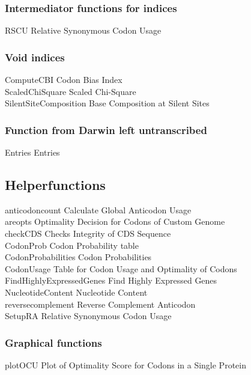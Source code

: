 \subsubsection{Intermediator functions for indices}
RSCU	Relative \quad Synonymous Codon Usage \\								%

\subsubsection{Void indices}
ComputeCBI	\quad Codon Bias Index  \\
ScaledChiSquare	\quad Scaled Chi-Square  \\
SilentSiteComposition	\quad Base Composition at Silent Sites  \\

\subsubsection{Function from Darwin left untranscribed}
Entries	\quad Entries \\

\subsection{Helperfunctions}
anticodoncount	\quad Calculate Global Anticodon Usage \\
areopts	\quad Optimality Decision for Codons of Custom Genome \\
checkCDS	Checks \quad Integrity of CDS Sequence \\
CodonProb	\quad Codon Probability table \\
CodonProbabilities	\quad Codon Probabilities \\
CodonUsage	\quad Table for Codon Usage and Optimality of Codons \\
FindHighlyExpressedGenes	\quad Find Highly Expressed Genes \\			%
NucleotideContent	\quad Nucleotide Content \\							%
reversecomplement	\quad Reverse Complement Anticodon \\
SetupRA	\quad Relative Synonymous Codon Usage \\

\subsubsection{Graphical functions}
plotOCU	\quad Plot of Optimality Score for Codons in a Single Protein \\


